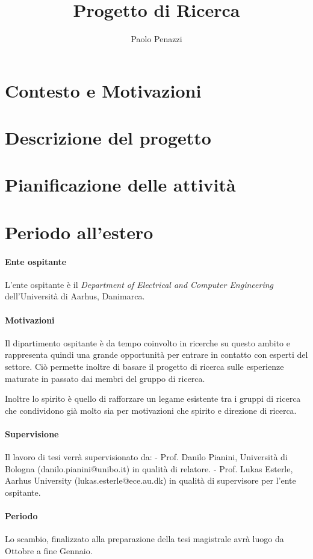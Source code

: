 \documentclass[12pt, a4paper]{article}
\title{Progetto di Ricerca}
\author{Paolo Penazzi}
\begin{document}
\maketitle
% 

\section{Contesto e Motivazioni} \label{sec:context}

\section{Descrizione del progetto}

\section{Pianificazione delle attività}

\section{Periodo all'estero}

\paragraph{Ente ospitante}
L'ente ospitante è il \textit{Department of Electrical and Computer Engineering} dell'Università di Aarhus, Danimarca.

\paragraph{Motivazioni}
Il dipartimento ospitante è da tempo coinvolto in ricerche su questo ambito e rappresenta
quindi una grande opportunità per entrare in contatto con esperti del settore.
Ciò permette inoltre di basare il progetto di ricerca sulle esperienze maturate in passato
dai membri del gruppo di ricerca.

Inoltre lo spirito è quello di rafforzare un legame esistente tra i gruppi di ricerca che
condividono già molto sia per motivazioni che spirito e direzione di ricerca.

\paragraph{Supervisione}
Il lavoro di tesi verrà supervisionato da:
- Prof. Danilo Pianini, Università di Bologna (danilo.pianini@unibo.it) in qualità di relatore.
- Prof. Lukas Esterle, Aarhus University (lukas.esterle@ece.au.dk) in qualità di supervisore per l'ente ospitante.

\paragraph{Periodo}
Lo scambio, finalizzato alla preparazione della tesi magistrale avrà luogo da Ottobre a fine Gennaio.




\end{document}
